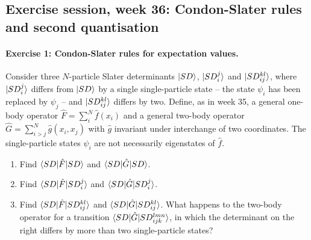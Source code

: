 \subsection*{Exercise session, week 36: Condon-Slater rules and second quantisation}

\paragraph{Exercise 1: Condon-Slater rules for expectation values.}
Consider three $N$-particle Slater determinants $\vert SD \rangle$, $\vert SD_i^j \rangle$
and $\vert SD_{ij}^{kl} \rangle$, where $\vert SD_i^j \rangle$ differs from $\vert SD \rangle$ by a
single single-particle state -- the state $\psi_i$ has been replaced by
$\psi_j$ -- and $\vert SD_{ij}^{kl} \rangle$ differs by two.  Define, as in
week 35, a general one-body operator $\hat{F}=\sum_i^{N}\hat{f}(x_i)$ and a
general two-body operator $\hat{G}=\sum_{i>j}^{N}\hat{g}(x_i,x_j)$ with
$\hat{g}$ invariant under interchange of two coordinates.  The
single-particle states $\psi_i$ are not necessarily eigenstates of $\hat{f}$.

\begin{enumerate}
  \item[a)] Find $\langle SD | \hat{F} | SD \rangle$ and $\langle SD | \hat{G} | SD \rangle$.
  \item[b)] Find $\langle SD | \hat{F} | SD_i^j \rangle$ and
        $\langle SD | \hat{G} | SD_i^j \rangle$.
  \item[c)] Find $\langle SD | \hat{F} | SD_{ij}^{kl} \rangle$ and
        $\langle SD | \hat{G} | SD_{ij}^{kl} \rangle$.  What happens to the two-body
        operator for a transition
        $\langle SD | \hat{G} | SD_{ijk}^{lmn} \rangle$, in which the determinant on
        the right differs by more than two single-particle states?
\end{enumerate}


